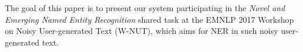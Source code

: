%

The goal of this paper is to present our system participating in the \textit{Novel and Emerging Named Entity Recognition} shared task at the EMNLP 2017 Workshop on Noisy User-generated Text (W-NUT), which aims for NER in such noisy user-generated text.


